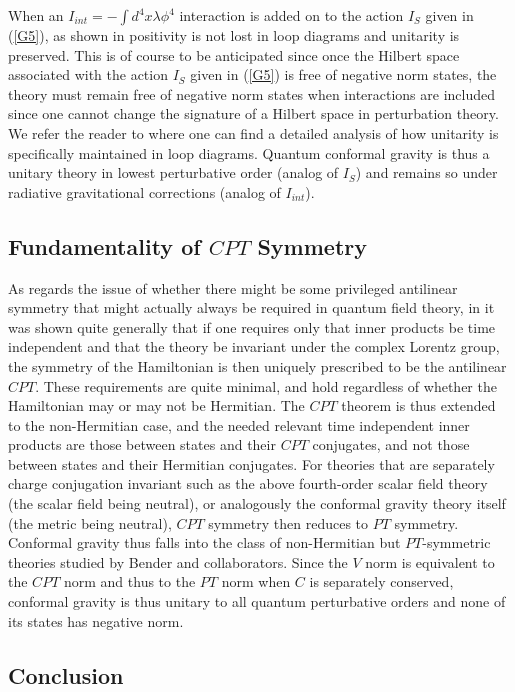 \documentclass[aps]{revtex4}
\begin{document}
When an $I_{int}=-\int d^4x \lambda \phi^4$ interaction is added on to the action $I_S$ given in (\ref{G5}), as shown in \cite{Mannheim2018} positivity is not lost in loop diagrams  and unitarity is preserved. This is of course to be anticipated since once the Hilbert space associated with the action $I_S$ given in (\ref{G5}) is free of negative norm states, the theory must  remain free of negative norm states  when interactions are included since one cannot change the signature of a Hilbert space in perturbation theory. We refer the reader to \cite{Mannheim2018} where one can find a detailed analysis of how unitarity is specifically maintained in loop diagrams. Quantum conformal gravity is thus a unitary theory in lowest perturbative order (analog of $I_S$) and remains so under radiative gravitational corrections (analog of $I_{int}$).

\subsection{Fundamentality of $CPT$ Symmetry}

As regards the issue of whether there might be some privileged antilinear symmetry that might actually always be required in quantum field theory, in \cite{Mannheim2016b,Mannheim2018b} it was shown quite generally that if one requires only that inner products be time independent and that the theory be invariant under the complex Lorentz group, the symmetry of the Hamiltonian is then uniquely prescribed to be the antilinear $CPT$. These requirements are quite  minimal, and hold regardless of whether the Hamiltonian may or may not be Hermitian. The $CPT$ theorem is thus extended to the non-Hermitian case, and the needed relevant time independent inner products are those between states and their $CPT$ conjugates, and not those between states and their Hermitian conjugates. For theories that are separately charge conjugation invariant such as the above fourth-order scalar field theory (the scalar field being neutral), or analogously the conformal gravity theory itself (the metric being neutral), $CPT$ symmetry then reduces to $PT$ symmetry. Conformal gravity thus falls into the class of non-Hermitian but $PT$-symmetric theories studied by Bender and collaborators. Since the $V$ norm is equivalent to the $CPT$ norm and thus to the $PT$ norm when $C$ is separately conserved, conformal gravity is thus unitary to all quantum perturbative orders and none of its states has negative norm. 

\subsection{Conclusion}
\end{document}
